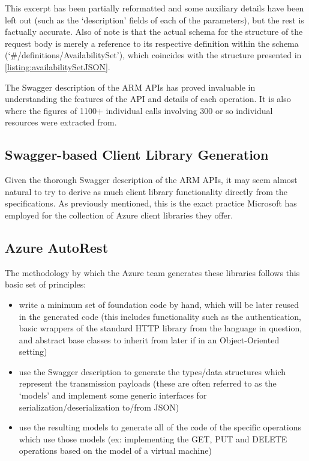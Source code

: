 \documentclass[11pt]{report}
\begin{document}
This excerpt has been partially reformatted and some auxiliary details
have been left out (such as the `description' fields of each of the
parameters), but the rest is factually accurate. Also of note is that the
actual schema for the structure of the request body is merely a reference to
its respective definition within the schema (`\#/definitions/AvailabilitySet'),
which coincides with the structure presented in \autoref{listing:availabilitySetJSON}.


The Swagger description of the ARM APIs has proved invaluable in understanding
the features of the API and details of each operation. It is also where the
figures of 1100+ individual calls involving 300 or so individual resources were
extracted from.

\subsection{Swagger-based Client Library Generation}

Given the thorough Swagger description of the ARM APIs, it may seem almost
natural to try to derive as much client library functionality directly from the
specifications. As previously mentioned, this is the exact practice
Microsoft has employed for the collection of Azure client libraries they offer.

\subsection{Azure AutoRest}

The methodology by which the Azure team generates these libraries follows this
basic set of principles:

\begin{itemize}
    \item{} write a minimum set of foundation code by hand, which will be later
        reused in the generated code (this includes functionality such as the
        authentication, basic wrappers of the standard HTTP library from the
        language in question, and abstract base classes to inherit from later if
        in an Object-Oriented setting)
    \item{} use the Swagger description to generate the types/data structures
        which represent the transmission payloads (these are often referred to
        as the `models' and implement some generic interfaces for
        serialization/deserialization to/from JSON)
    \item{} use the resulting models to generate all of the code of the
        specific operations which use those models (ex: implementing the
        GET, PUT and DELETE operations based on the model of a virtual machine)
\end{itemize}
\end{document}
